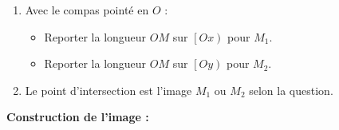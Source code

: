 \begin{methode*1}
\begin{minipage}{0.55\linewidth}
\begin{enumerate}
\begin{itemize}
            \end{itemize}
            \item Avec le compas pointé en $O$ :
            \begin{itemize}
                \item Reporter la longueur $OM$ sur $\left[Ox\right)$ pour $M_1$.
                \item Reporter la longueur $OM$ sur $\left[Oy\right)$ pour $M_2$.
            \end{itemize}
            \item Le point d'intersection est l'image $M_1$ ou $M_2$ selon la question.
        \end{enumerate}
    \end{minipage}
    \begin{myBox}{}
        \begin{minipage}{\linewidth}
            \textbf{Construction de l'image :}


            \medskip
            \creditInstrumentPoche
        \end{minipage}
    \end{myBox}
\end{methode*1}
